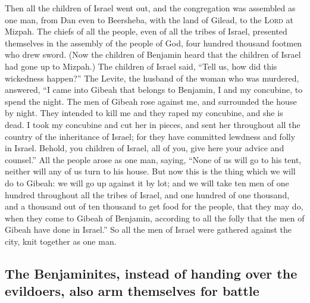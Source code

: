  Then all the children of Israel went out, and the
congregation was assembled as one man, from Dan even to Beersheba, with
the land of Gilead, to the \textsc{Lord} at Mizpah.  The
chiefs of all the people, even of all the tribes of Israel, presented
themselves in the assembly of the people of God, four hundred thousand
footmen who drew sword.  (Now the children of Benjamin
heard that the children of Israel had gone up to Mizpah.) The children
of Israel said, ``Tell us, how did this wickedness happen?''
 The Levite, the husband of the woman who was murdered,
answered, ``I came into Gibeah that belongs to Benjamin, I and my
concubine, to spend the night.  The men of Gibeah rose
against me, and surrounded the house by night. They intended to kill me
and they raped my concubine, and she is dead.  I took my
concubine and cut her in pieces, and sent her throughout all the country
of the inheritance of Israel; for they have committed lewdness and folly
in Israel.  Behold, you children of Israel, all of you,
give here your advice and counsel.''  All the people arose
as one man, saying, ``None of us will go to his tent, neither will any
of us turn to his house.  But now this is the thing which
we will do to Gibeah: we will go up against it by lot; 
and we will take ten men of one hundred throughout all the tribes of
Israel, and one hundred of one thousand, and a thousand out of ten
thousand to get food for the people, that they may do, when they come to
Gibeah of Benjamin, according to all the folly that the men of Gibeah
have done in Israel.''  So all the men of Israel were
gathered against the city, knit together as one man.

\hypertarget{the-benjaminites-instead-of-handing-over-the-evildoers-also-arm-themselves-for-battle}{%
\subsection{The Benjaminites, instead of handing over the evildoers,
also arm themselves for
battle}\label{the-benjaminites-instead-of-handing-over-the-evildoers-also-arm-themselves-for-battle}}

